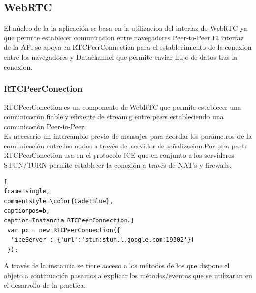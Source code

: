 \subsection{WebRTC}
El núcleo de la la aplicación se basa en la utilizacion del interfaz de WebRTC ya que permite establecer comunicacion entre navegadores Peer-to-Peer.El interfaz de la API se apoya en RTCPeerConnection para el establecimiento de la conexion entre los navegadores y Datachannel que permite enviar flujo de datos tras la conexion.
\subsubsection*{RTCPeerConection}
RTCPeerConection es un componente de WebRTC que permite establecer una comunicación fiable y eficiente de streamig entre peers estableciendo una comunicación Peer-to-Peer.
\\Es necesario un intercambio previo de mensajes para acordar los parámetros de la comunicación entre los nodos a través del servidor de señalizacion.Por otra parte RTCPeerConection usa en el protocolo ICE que en conjunto a los servidores STUN/TURN permite establecer la conexión a través de NAT's y firewalls.
\begin{lstlisting}[
frame=single,
commentstyle=\color{CadetBlue},
captionpos=b,
caption=Instancia RTCPeerConnection.]
 var pc = new RTCPeerConnection({
  'iceServer':[{'url':'stun:stun.l.google.com:19302'}]
 });
\end{lstlisting}
A través de la instancia se tiene acceso a los métodos de los que dispone el objeto,a continuación pasamos a explicar los métodos/eventos que se utilizaran en el desarrollo de la practica.
